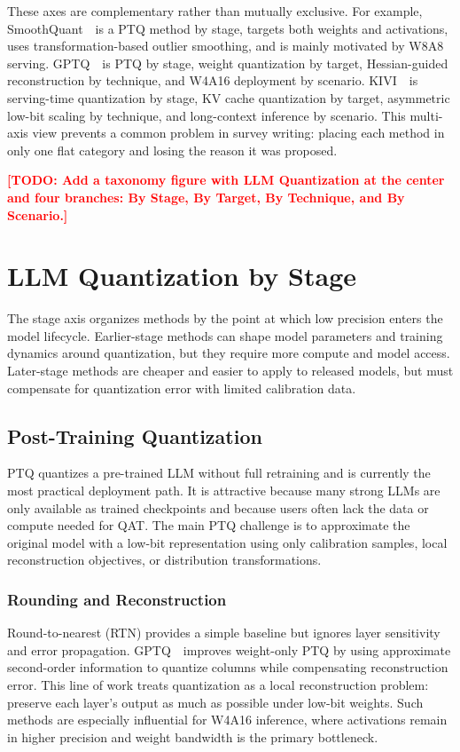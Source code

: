 \documentclass[journal,10pt]{IEEEtran}
\newcommand{\TODO}[1]{\textcolor{red}{\textbf{[TODO: #1]}}}
\begin{document}
These axes are complementary rather than mutually exclusive. For example, SmoothQuant~\cite{xiao2022smoothquant}\ is a PTQ method by stage, targets both weights and activations, uses transformation-based outlier smoothing, and is mainly motivated by W8A8 serving. GPTQ~\cite{frantar2022gptq}\ is PTQ by stage, weight quantization by target, Hessian-guided reconstruction by technique, and W4A16 deployment by scenario. KIVI~\cite{liu2024kivi}\ is serving-time quantization by stage, KV cache quantization by target, asymmetric low-bit scaling by technique, and long-context inference by scenario. This multi-axis view prevents a common problem in survey writing: placing each method in only one flat category and losing the reason it was proposed.

\TODO{Add a taxonomy figure with LLM Quantization at the center and four branches: By Stage, By Target, By Technique, and By Scenario.}

\section{LLM Quantization by Stage}

The stage axis organizes methods by the point at which low precision enters the model lifecycle. Earlier-stage methods can shape model parameters and training dynamics around quantization, but they require more compute and model access. Later-stage methods are cheaper and easier to apply to released models, but must compensate for quantization error with limited calibration data.

\subsection{Post-Training Quantization}
PTQ quantizes a pre-trained LLM without full retraining and is currently the most practical deployment path. It is attractive because many strong LLMs are only available as trained checkpoints and because users often lack the data or compute needed for QAT. The main PTQ challenge is to approximate the original model with a low-bit representation using only calibration samples, local reconstruction objectives, or distribution transformations.

\subsubsection{Rounding and Reconstruction}
Round-to-nearest (RTN) provides a simple baseline but ignores layer sensitivity and error propagation. GPTQ~\cite{frantar2022gptq}\ improves weight-only PTQ by using approximate second-order information to quantize columns while compensating reconstruction error. This line of work treats quantization as a local reconstruction problem: preserve each layer's output as much as possible under low-bit weights. Such methods are especially influential for W4A16 inference, where activations remain in higher precision and weight bandwidth is the primary bottleneck.
\end{document}
